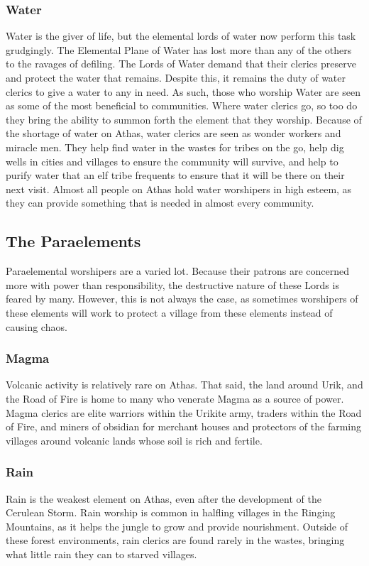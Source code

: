 \subsubsection{Water}
Water is the giver of life, but the elemental lords of water now perform this task grudgingly. The Elemental Plane of Water has lost more than any of the others to the ravages of defiling. The Lords of Water demand that their clerics preserve and protect the water that remains. Despite this, it remains the duty of water clerics to give a water to any in need. As such, those who worship Water are seen as some of the most beneficial to communities. Where water clerics go, so too do they bring the ability to summon forth the element that they worship. Because of the shortage of water on Athas, water clerics are seen as wonder workers and miracle men. They help find water in the wastes for tribes on the go, help dig wells in cities and villages to ensure the community will survive, and help to purify water that an elf tribe frequents to ensure that it will be there on their next visit. Almost all people on Athas hold water worshipers in high esteem, as they can provide something that is needed in almost every community.

\subsection{The Paraelements}
Paraelemental worshipers are a varied lot. Because their patrons are concerned more with power than responsibility, the destructive nature of these Lords is feared by many. However, this is not always the case, as sometimes worshipers of these elements will work to protect a village from these elements instead of causing chaos.

\subsubsection{Magma}
Volcanic activity is relatively rare on Athas. That said, the land around Urik, and the Road of Fire is home to many who venerate Magma as a source of power. Magma clerics are elite warriors within the Urikite army, traders within the Road of Fire, and miners of obsidian for merchant houses and protectors of the farming villages around volcanic lands whose soil is rich and fertile.

\subsubsection{Rain}
Rain is the weakest element on Athas, even after the development of the Cerulean Storm. Rain worship is common in halfling villages in the Ringing Mountains, as it helps the jungle to grow and provide nourishment. Outside of these forest environments, rain clerics are found rarely in the wastes, bringing what little rain they can to starved villages.

